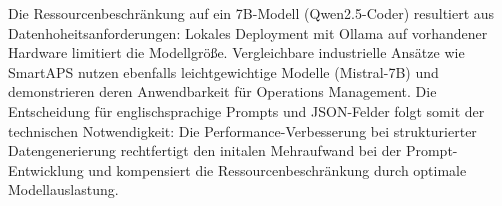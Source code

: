 Die Ressourcenbeschränkung auf ein 7B-Modell (Qwen2.5-Coder) resultiert aus
Datenhoheitsanforderungen: Lokales Deployment mit Ollama \cite{ollama:local_llm2024}
auf vorhandener Hardware limitiert die Modellgröße. Vergleichbare industrielle
Ansätze wie SmartAPS \cite{smartaps2025} nutzen ebenfalls leichtgewichtige
Modelle (Mistral-7B) und demonstrieren deren Anwendbarkeit für Operations
Management. Die Entscheidung für englischsprachige Prompts und JSON-Felder
folgt somit der technischen Notwendigkeit: Die Performance-Verbesserung bei
strukturierter Datengenerierung rechtfertigt den initalen Mehraufwand bei
der Prompt-Entwicklung und kompensiert die Ressourcenbeschränkung durch
optimale Modellauslastung.

